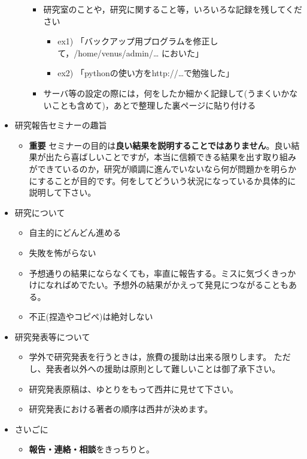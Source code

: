 \documentclass[11pt, ]{jsarticle}
\providecommand{\tightlist}{%
   \setlength{\itemsep}{0pt}\setlength{\parskip}{0pt}}
\begin{document}
\begin{itemize}
\begin{itemize}
    \begin{itemize}
    \tightlist
    \item
      研究室のことや，研究に関すること等，いろいろな記録を残してください

      \begin{itemize}
      \tightlist
      \item
        ex1)
        「バックアップ用プログラムを修正して，/home/venus/admin/\ldots{}
        においた」
      \item
        ex2) 「pythonの使い方をhttp://\ldots で勉強した」
      \end{itemize}
    \item
      サーバ等の設定の際には，何をしたか細かく記録して(うまくいかないことも含めて)，あとで整理した裏ページに貼り付ける
    \end{itemize}
  \end{itemize}
\item
  研究報告セミナーの趣旨

  \begin{itemize}
  \tightlist
  \item
    \textbf{重要}
    セミナーの目的は\textbf{良い結果を説明することではありません}。良い結果が出たら喜ばしいことですが，本当に信頼できる結果を出す取り組みができているのか，研究が順調に進んでいないなら何が問題かを明らかにすることが目的です。何をしてどういう状況になっているか具体的に説明して下さい。
  \end{itemize}
\item
  研究について

  \begin{itemize}
  \tightlist
  \item
    自主的にどんどん進める
  \item
    失敗を怖がらない
  \item
    予想通りの結果にならなくても，率直に報告する。ミスに気づくきっかけになればめでたい。予想外の結果がかえって発見につながることもある。
  \item
    不正(捏造やコピペ)は絶対しない
  \end{itemize}
\item
  研究発表等について

  \begin{itemize}
  \tightlist
  \item
    学外で研究発表を行うときは，旅費の援助は出来る限りします。
    ただし、発表者以外への援助は原則として難しいことは御了承下さい。
  \item
    研究発表原稿は、ゆとりをもって西井に見せて下さい。
  \item
    研究発表における著者の順序は西井が決めます。
  \end{itemize}
\item
  さいごに

  \begin{itemize}
  \tightlist
  \item
    \textbf{報告・連絡・相談}をきっちりと。
  \end{itemize}
\end{itemize}
\end{document}
